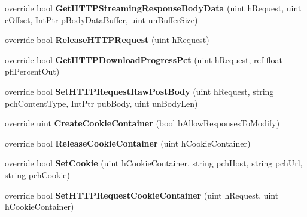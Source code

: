 \begin{DoxyCompactItemize}
\item 
\hypertarget{classValve_1_1Steamworks_1_1CSteamHTTP_aa84af3be1230d4b6b89cf7e1b391b101}{}override bool {\bfseries Get\+H\+T\+T\+P\+Streaming\+Response\+Body\+Data} (uint h\+Request, uint c\+Offset, Int\+Ptr p\+Body\+Data\+Buffer, uint un\+Buffer\+Size)\label{classValve_1_1Steamworks_1_1CSteamHTTP_aa84af3be1230d4b6b89cf7e1b391b101}

\item 
\hypertarget{classValve_1_1Steamworks_1_1CSteamHTTP_a4be96a6c3fdf40a0546dacee1122cd22}{}override bool {\bfseries Release\+H\+T\+T\+P\+Request} (uint h\+Request)\label{classValve_1_1Steamworks_1_1CSteamHTTP_a4be96a6c3fdf40a0546dacee1122cd22}

\item 
\hypertarget{classValve_1_1Steamworks_1_1CSteamHTTP_a2d8f5c51eda98d14972c1d92882fb64c}{}override bool {\bfseries Get\+H\+T\+T\+P\+Download\+Progress\+Pct} (uint h\+Request, ref float pfl\+Percent\+Out)\label{classValve_1_1Steamworks_1_1CSteamHTTP_a2d8f5c51eda98d14972c1d92882fb64c}

\item 
\hypertarget{classValve_1_1Steamworks_1_1CSteamHTTP_a9188a5263563fc91f30b6d7bbc168426}{}override bool {\bfseries Set\+H\+T\+T\+P\+Request\+Raw\+Post\+Body} (uint h\+Request, string pch\+Content\+Type, Int\+Ptr pub\+Body, uint un\+Body\+Len)\label{classValve_1_1Steamworks_1_1CSteamHTTP_a9188a5263563fc91f30b6d7bbc168426}

\item 
\hypertarget{classValve_1_1Steamworks_1_1CSteamHTTP_a8f284429ef15cf27889d42e43b9a6c77}{}override uint {\bfseries Create\+Cookie\+Container} (bool b\+Allow\+Responses\+To\+Modify)\label{classValve_1_1Steamworks_1_1CSteamHTTP_a8f284429ef15cf27889d42e43b9a6c77}

\item 
\hypertarget{classValve_1_1Steamworks_1_1CSteamHTTP_aa47aff8b337f5b09d24a7d2a85c3f4c0}{}override bool {\bfseries Release\+Cookie\+Container} (uint h\+Cookie\+Container)\label{classValve_1_1Steamworks_1_1CSteamHTTP_aa47aff8b337f5b09d24a7d2a85c3f4c0}

\item 
\hypertarget{classValve_1_1Steamworks_1_1CSteamHTTP_af3023a92df3c8158e10241eac4e7f388}{}override bool {\bfseries Set\+Cookie} (uint h\+Cookie\+Container, string pch\+Host, string pch\+Url, string pch\+Cookie)\label{classValve_1_1Steamworks_1_1CSteamHTTP_af3023a92df3c8158e10241eac4e7f388}

\item 
\hypertarget{classValve_1_1Steamworks_1_1CSteamHTTP_a17b284d9d9ed0e9ca184bbb78473efb1}{}override bool {\bfseries Set\+H\+T\+T\+P\+Request\+Cookie\+Container} (uint h\+Request, uint h\+Cookie\+Container)\label{classValve_1_1Steamworks_1_1CSteamHTTP_a17b284d9d9ed0e9ca184bbb78473efb1}


\end{DoxyCompactItemize}
